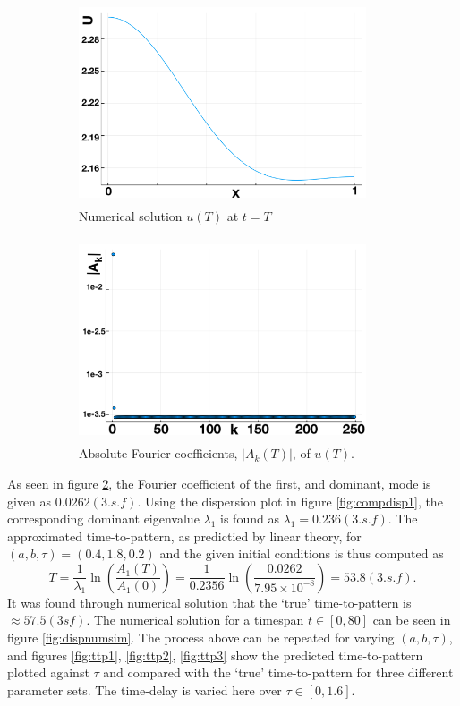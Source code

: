 \documentclass[12pt]{report}
\begin{document}
\begin{figure}[H]
    \centering
    \begin{subfigure}[b]{0.45\textwidth}
        \centering
        \includegraphics[width=8.5cm,height=6cm]{Tu.png}
        \caption{Numerical solution $u(T)$ at $t=T$}
        \label{uT}
    \end{subfigure}
    \hfill
    \begin{subfigure}[b]{0.45\textwidth}
        \centering
        \includegraphics[width=8.5cm,height=6cm]{Tfc.png}
        \caption{Absolute Fourier coefficients, $|A_k(T)|$, of $u(T)$.}
        \label{fig:uTfc}
    \end{subfigure}
    \caption{}
    \label{fig:Tfc}
\end{figure}
As seen in figure \ref{fig:uTfc}, the Fourier coefficient of the first, and dominant, mode is given as $0.0262(3.s.f)$. Using the dispersion plot in figure \ref{fig:compdisp1}, the corresponding dominant eigenvalue $\lambda_1$ is found as $\lambda_1=0.236(3.s.f)$. The approximated time-to-pattern, as predictied by linear theory, for $(a,b,\tau)=(0.4,1.8,0.2)$ and the given initial conditions is thus computed as
\begin{equation}
    T=\frac{1}{\lambda_1}\ln\left(\frac{A_1(T)}{A_1(0)}\right)=\frac{1}{0.2356}\ln\left(\frac{0.0262}{7.95\times10^{-8}}\right)=53.8(3.s.f).
\end{equation}
It was found through numerical solution that the `true' time-to-pattern is $\approx57.5(3sf)$. The numerical solution for a timespan $t\in[0,80]$ can be seen in figure \ref{fig:dispnumsim}. The process above can be repeated for varying $(a,b,\tau)$, and figures \ref{fig:ttp1}, \ref{fig:ttp2}, \ref{fig:ttp3} show the predicted time-to-pattern plotted against $\tau$ and compared with the `true' time-to-pattern for three different parameter sets. The time-delay is varied here over $\tau\in[0,1.6]$.
\end{document}
